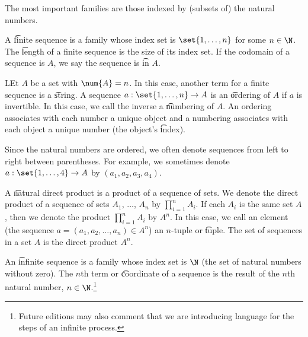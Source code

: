 

The most important families are those indexed by (subsets of) the natural numbers.


A \t{finite sequence} is a family whose index set is $\set{1, \dots, n}$ for some $n \in \N$.
The \t{length} of a finite sequence is the size of its index set.
If the codomain of a sequence is $A$, we say the sequence is \t{in} $A$.

LEt $A$ be a set with $\num{A} = n$.
In this case, another term for a finite sequence is a \t{string}.
A sequence $a: \set{1, \dots, n} \to A$ is an \t{ordering} of $A$ if $a$ is invertible.
In this case, we call the inverse a \t{numbering} of $A$.
An ordering associates with each number a unique object and a numbering associates with each object a unique number (the object's \t{index}).


Since the natural numbers are ordered, we often denote sequences from left to right between parentheses.
For example, we sometimes denote $a: \set{1, \dots, 4} \to A$ by $(a_1, a_2, a_3, a_4)$.


A \t{natural direct product} is a product of a sequence of sets.
We denote the direct product of a sequence of sets $A_1$, $\dots$, $A_n$ by $\prod_{i = 1}^{n} A_i$.
If each $A_i$ is the same set $A$, then we denote the product $\prod_{i = 1}^{n} A_i$ by $A^n$.
In this case, we call an element (the sequence $a = (a_1, a_2, \dots, a_n) \in A^n$) an \t{$n$-tuple} or \t{tuple}.
The set of sequences in a set $A$ is the direct product $A^n$.


An \t{infinite sequence} is a family whose index set is $\N$ (the set of natural numbers without zero).
The \t{$n$th term} or \t{coordinate} of a sequence is the result of the $n$th natural number, $n \in \N$.\footnote{Future editions may also comment that we are introducing language for the steps of an infinite process.}

